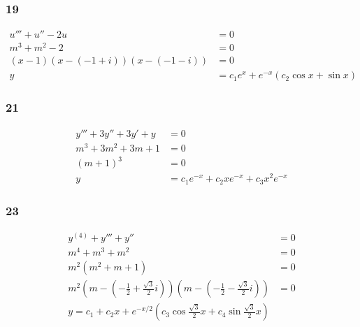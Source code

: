\documentclass{article}
\begin{document}
\subsubsection{19}

\begin{align*}
  u''' + u'' - 2u                       & = 0                                        \\
  m^3 + m^2 - 2                         & = 0                                        \\
  (x - 1) (x - (-1 + i)) (x - (-1 - i)) & = 0                                        \\
  y                                     & = c_1 e^{x} + e^{-x} (c_2 \cos x + \sin x)
\end{align*}

\subsubsection{21}

\begin{align*}
  y''' + 3y'' + 3y' + y & = 0                                          \\
  m^3 + 3m^2 + 3m + 1   & = 0                                          \\
  (m + 1)^3             & = 0                                          \\
  y                     & = c_1 e^{-x} + c_2 x e^{-x} + c_3 x^2 e^{-x}
\end{align*}

\subsubsection{23}

\begin{align*}
  y^{(4)} + y''' + y''                                                                                                                            & = 0 \\
  m^4 + m^3 + m^2                                                                                                                                 & = 0 \\
  m^2 (m^2 + m + 1)                                                                                                                               & = 0 \\
  m^2 \left( m - \left( -\frac{1}{2} + \frac{\sqrt{3}}{2} i \right) \right) \left( m - \left( -\frac{1}{2} - \frac{\sqrt{3}}{2} i \right) \right) & = 0 \\
  y                                                                                                                                               = c_1 + c_2 x + e^{-x/2} \left( c_3 \cos \frac{\sqrt{3}}{2} x + c_4 \sin \frac{\sqrt{3}}{2} x \right)
\end{align*}
\end{document}
